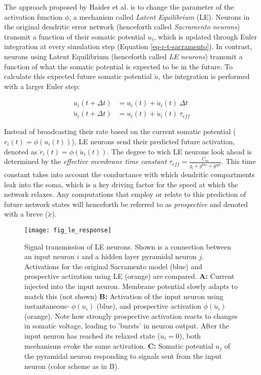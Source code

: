 The approach proposed by Haider et al. is to change the parameter of the activation function $\phi$, a mechanism called
\textit{Latent Equilibrium} (LE). Neurons in the original dendritic error network (henceforth called \textit{Sacramento
  neurons}) transmit a function of their somatic potential $u_i$, which is updated through Euler integration at every
simulation step (Equation \ref{eq-r-t-sacramento}). In contrast, neurons using Latent Equilibrium (henceforth called
\textit{LE neurons}) transmit a function of what the somatic potential is expected to be in the future. To calculate
this expected future somatic potential $\breve{u}$, the integration is performed with a larger Euler step:

\begin{align}
  u_i(t+ \Delta t)          & = u_i(t) + \dot{u}_i(t) \ \Delta t \label{eq-r-t-sacramento} \\
  \breve{u}_i(t + \Delta t) & = u_i(t) + \dot{u}_i(t) \ \tau_{eff} \label{eq-r-t-haider}
\end{align}

Instead of broadcasting their rate based on the current somatic potential ($r_i(t) = \phi(u_i(t))$), LE neurons send
their predicted future activation, denoted as $\breve{r}_i(t) = \phi(\breve{u}_i(t))$. The degree to wich LE neurons
look ahead is determined by the \textit{effective membrane time constant} $\tau_{eff} = \frac{C_m}{g_l + g^{bas} +
    g^{api}}$. This time constant takes into account the conductance with which dendritic compartments leak into the soma,
which is a key driving factor for the speed at which the network relaxes. Any computations that employ or relate to this
prediction of future network states will henceforth be referred to as \textit{prospective} and denoted with a breve
($\breve{x}$).


\begin{figure}[h!]
  \centering
  \texttt{[image: fig\_le\_response]}
  \caption[Signal transmission of LE neurons]{Signal transmission of LE neurons. Shown is a connection between an input
    neuron $i$ and a hidden layer pyramidal neuron $j$. Activations for the original Sacramento model (blue) and
    prospective activation using LE (orange) are compared. \textbf{A:} Current injected into the input neuron. Membrane
    potential slowly adapts to match this (not shown) \textbf{B:} Activation of the input neuron using instantaneous-
    $\phi(u_i)$ (blue), and prospective activation $\phi(\breve{u}_i)$ (orange). Note how strongly prospective
    activation reacts to changes in somatic voltage, leading to 'bursts' in neuron output. After the input neuron has
    reached its relaxed state ($\dot{u}_i = 0$), both mechanisms evoke the same activation. \textbf{C:} Somatic
    potential $u_j$ of the pyramidal neuron responding to signals sent from the input neuron (color scheme as in B).}
  \label{fig-comparison-le}
\end{figure}

